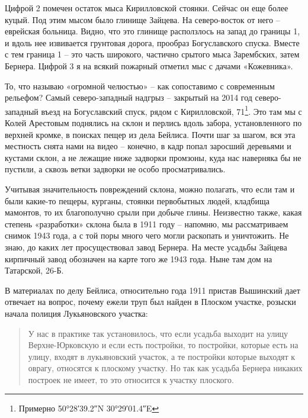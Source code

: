 Цифрой 2 помечен остаток мыса Кирилловской стоянки. Сейчас он еще более куцый. Под этим мысом было глинище Зайцева. На северо-восток от него – еврейская больница. Видно, что это глинище расползлось на запад до границы 1, и вдоль нее извивается грунтовая дорога, прообраз Богуславского спуска. Вместе с тем граница 1 – это часть широкого, частично срытого мыса Зарембских, затем Бернера. Цифрой 3 я на всякий пожарный отметил мыс с дачами «Кожевника».

То, что называю «огромной челюстью» – как сопоставимо с современным рельефом?  Самый северо-западный надгрыз – закрытый на 2014 год северо-западный въезд на Богуславский спуск, рядом с Кирилловской, 71\footnote{Примерно 50°28′39.2″N 30°29′01.4″E}. Это там мы с Колей Арестовым поднялись на склон и перлись вдоль забора, установленного по верхней кромке, в поисках пещер из дела Бейлиса. Почти шаг за шагом, вся эта местность снята нами на видео – конечно, в кадр попал заросший деревьями и кустами склон, а не лежащие ниже задворки промзоны, куда нас наверняка бы не пустили, а сквозь ветки задворки не особо просматривались.

Учитывая значительность повреждений склона, можно полагать, что если там и были какие-то пещеры, курганы, стоянки первобытных людей, кладбища мамонтов, то их благополучно срыли при добыче глины. Неизвестно также, какая степень «разработки» склона была в 1911 году – напомню, мы рассматриваем снимок 1943 года, а с той поры много чего могли раскопать и уничтожить. Не знаю, до каких лет просуществовал завод Бернера. На месте усадьбы Зайцева кирпичный завод обозначен на карте того же 1943 года. Ныне там дом на Татарской, 26-Б.

В материалах по делу Бейлиса, относительно года 1911 пристав Вышинский дает отвечает на вопрос, почему ежели труп был найден в Плоском участке, розыски начала полиция Лукьяновского участка:

\begin{quotation}
У нас в практике так установилось, что если усадьба выходит на улицу Верхне-Юрковскую и если есть постройки, то постройки, которые есть на улицу, входят в лукьяновский участок, а те постройки которые выходят к оврагу, относятся к плоскому участку. Но так как усадьба Бернера никаких построек не имеет, то это относится к участку плоского.
\end{quotation}


\newpage

